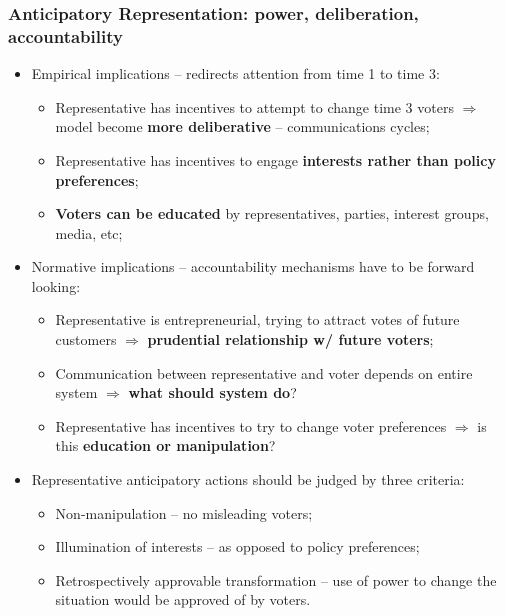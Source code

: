 \documentclass[aspectratio=169]{beamer}
\theoremstyle{principle}
\begin{document}
\begin{frame}
\frametitle{Anticipatory Representation: power, deliberation, accountability}
\begin{itemize}
\item Empirical implications -- redirects attention from time 1 to time 3:
\begin{itemize}
\item Representative has incentives to attempt to change time 3 voters $\Rightarrow$ model become \textbf{more deliberative} -- communications cycles;
\item Representative has incentives to engage \textbf{interests rather than policy preferences};
\item \textbf{Voters can be educated} by representatives, parties, interest groups, media, etc;
\end{itemize}

\item Normative implications -- accountability mechanisms have to be forward looking:
\begin{itemize}
\item Representative is entrepreneurial, trying to attract votes of future customers $\Rightarrow$ \textbf{prudential relationship w/ future voters};
\item Communication between representative and voter depends on entire system $\Rightarrow$ \textbf{what should system do}?
\item Representative has incentives to try to change voter preferences $\Rightarrow$ is this \textbf{education or manipulation}?
\end{itemize}

\item Representative anticipatory actions should be judged by three criteria:
\begin{itemize}
\item Non-manipulation -- no misleading voters;
\item Illumination of interests -- as opposed to policy preferences;
\item Retrospectively approvable transformation -- use of power to change the situation would be approved of by voters.
\end{itemize}
\end{itemize}

\end{frame}
\end{document}
